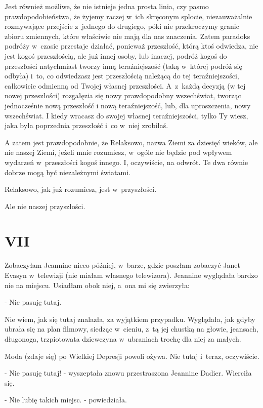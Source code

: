 \documentclass[oneside,polish,12pt,sfheadings]{mwbk}
\begin{document}
Jest również możliwe, że nie istnieje jedna prosta linia, czy pasmo
prawdopodobieństwa, że żyjemy raczej w~ich skręconym splocie, niezauważalnie
rozmywające przejście z~jednego do drugiego, póki nie przekroczymy
granic zbioru zmiennych, które właściwie nie mają dla nas znaczenia.
Zatem paradoks podróży w~czasie przestaje działać, ponieważ przeszłość,
którą ktoś odwiedza, nie jest kogoś przeszłością, ale już innej osoby,
lub inaczej, podróż kogoś do przeszłości natychmiast tworzy inną teraźniejszość
(taką w~której podróż się odbyła) i~to, co odwiedzasz jest przeszłością
należącą do tej teraźniejszości, całkowicie odmienną od Twojej własnej
przeszłości. A~z~każdą decyzją (w tej nowej przeszłości) rozgałęzia
się nowy prawdopodobny wszechświat, tworząc jednocześnie nową przeszłość
i nową teraźniejszość, lub, dla uproszczenia, nowy wszechświat. I
kiedy wracasz do swojej własnej teraźniejszości, tylko Ty wiesz, jaka
była poprzednia przeszłość i~co w~niej zrobiłaś.

A zatem jest prawdopodobnie, że Relaksowo, nazwa Ziemi za dziesięć
wieków, ale nie naszej Ziemi, jeżeli mnie rozumiesz, w~ogóle nie będzie
pod wpływem wydarzeń w~przeszłości kogoś innego. I, oczywiście, na
odwrót. Te dwa równie dobrze mogą być niezależnymi światami.

Relaksowo, jak już rozumiesz, jest w~przyszłości.

Ale nie naszej przyszłości.

\chapter{VII}

Zobaczyłam Jeannine nieco później, w~barze, gdzie poszłam zobaczyć
Janet Evasyn w~telewizji (nie miałam własnego telewizora). Jeannine
wyglądała bardzo nie na miejscu. Usiadłam obok niej, a~ona mi się
zwierzyła: 

- Nie pasuję tutaj. 

Nie wiem, jak się tutaj znalazła, za
wyjątkiem przypadku. Wyglądała, jak gdyby ubrała się na plan filmowy,
siedząc w~cieniu, z~tą jej chustką na głowie, jeansach, długonoga,
trzpiotowata dziewczyna w~ubraniach trochę dla niej za małych.

Moda (zdaje się) po Wielkiej Depresji powoli ożywa. Nie tutaj i~teraz,
oczywiście. 

- Nie pasuję tutaj! - wyszeptała znowu przestraszona Jeannine
Dadier. Wierciła się. 

- Nie lubię takich miejsc. - powiedziała.
\end{document}
